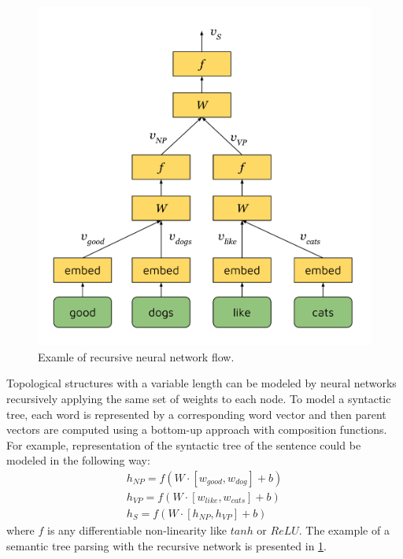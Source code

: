 \begin{figure}[h]
\centering
\includegraphics[width=5in]{Figures/rvnn.pdf}
\decoRule
\caption[RvNN flow]{Examle of recursive neural network flow.}
\label{fig:rvnn}
\end{figure}

Topological structures with a variable length can be modeled by neural networks recursively applying the same set of weights to each node. To model a syntactic tree, each word is represented by a corresponding word vector and then parent vectors are computed using a bottom-up approach with composition functions. For example, representation of the syntactic tree of the sentence  could be modeled in the following way:
\begin{equation}
\begin{split}
h_{NP} = f(W\cdot[w_{good}, w_{dog}] + b)\\
h_{VP} = f(W\cdot[w_{like}, w_{cats}] + b)\\
h_S = f(W\cdot[h_{NP}, h_{VP}] + b)
\label{rvnn:example}
\end{split}
\end{equation}
where $f$ is any differentiable non-linearity like $tanh$ or $ReLU$. The example of a semantic tree parsing with the recursive network is presented in \cref{fig:rvnn}.

